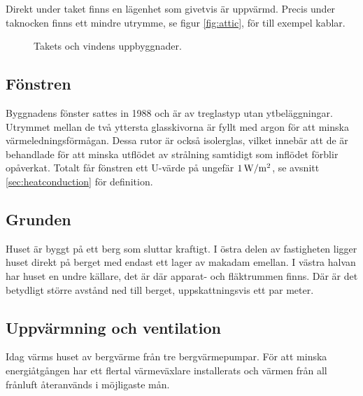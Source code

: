 Direkt under taket finns en lägenhet som givetvis är uppvärmd. Precis under taknocken finns ett mindre utrymme, se figur \ref{fig:attic}, för till exempel kablar.

\begin{figure}[hpbt]
\centering
{}
\caption{\label{fig:roof_attic} Takets och vindens uppbyggnader.}
\end{figure}


\subsection{Fönstren}

Byggnadens fönster sattes in 1988 och är av treglastyp utan ytbeläggningar. Utrymmet mellan de två yttersta glasskivorna är fyllt med argon för att minska värmeledningsförmågan. Dessa rutor är också isolerglas, vilket innebär att de är behandlade för att minska utflödet av strålning samtidigt som inflödet förblir opåverkat.  Totalt får fönstren ett U-värde på ungefär $\unit[1]{W/m^2}$, se avsnitt \ref{sec:heatconduction} för definition. 

\subsection{Grunden}

Huset är byggt på ett berg som sluttar kraftigt. I östra delen av fastigheten ligger huset direkt på berget med endast ett lager av makadam emellan\cite{petersarneo}. I västra halvan har huset en undre källare, det är där apparat- och fläktrummen finns. Där är det betydligt större avstånd ned till berget, uppskattningsvis ett par meter. %

\subsection{Uppvärmning och ventilation}
Idag värms huset av bergvärme från tre bergvärmepumpar. För att minska energiåtgången har ett flertal värmeväxlare installerats och värmen från all frånluft återanvänds i möjligaste mån.

